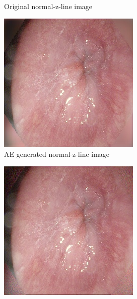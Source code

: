 \begin{figure}[h]
\begin{subfigure}[t]{\myfigsizethree}
            \caption{Original normal-z-line image }   
            \label{fig:z_ORIG_CORNER1}
        \end{subfigure}
        \qquad
        \begin{subfigure}[t]{\myfigsizethree}   
            \centering 
            \includegraphics[width=\textwidth]{experiments/figures/blackcorner/zAE.jpg}
            \caption{AE generated normal-z-line image }   
            \label{fig:z_AE_CORNER1}
        \end{subfigure}
        \qquad%
        \begin{subfigure}[t]{\myfigsizethree}   
            \centering 
            \includegraphics[width=\textwidth]{experiments/figures/blackcorner/zGAN.jpg}

\end{subfigure}
\end{figure}
